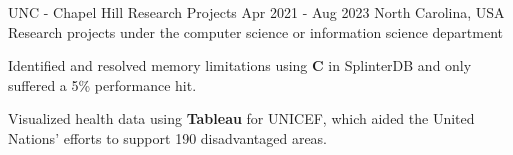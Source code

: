 \begin{cventries}
  \cventry
    {UNC - Chapel Hill} %
    {Research Projects} %
    {Apr 2021 - Aug 2023} %
    {North Carolina, USA} %
    {Research projects under the computer science or information science department}
    {
      \begin{cvitems} %
        \item {Identified and resolved memory limitations using \textbf{C} in SplinterDB and only suffered a 5\% performance hit.}
        \item {Visualized health data using \textbf{Tableau} for UNICEF, which aided the United Nations' efforts to support 190 disadvantaged areas.}
      \end{cvitems}
    }


\end{cventries}
